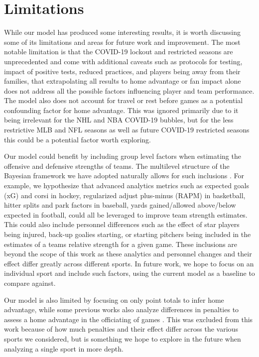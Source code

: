 \section*{Limitations}

While our model has produced some interesting results, it is worth discussing some of its limitations and areas for future work and improvement. The most notable limitation is that the COVID-19 lockout and restricted seasons are unprecedented and come with additional caveats such as protocols for testing, impact of positive tests, reduced practices, and players being away from their families, that extrapolating all results to home advantage or fan impact alone does not address all the possible factors influencing player and team performance. The model also does not account for travel or rest before games as a potential confounding factor for home advantage. This was ignored primarily due to it being irrelevant for the NHL and NBA COVID-19 bubbles, but for the less restrictive MLB and NFL seasons as well as future COVID-19 restricted seasons this could be a potential factor worth exploring.

Our model could benefit by including group level factors when estimating the offensive and defensive strengths of teams. The multilevel structure of the Bayesian framework we have adopted naturally allows for such inclusions \cite{Gelman2006} \cite{Gelman2014} \cite{McElreath2020}. For example, we hypothesize that advanced analytics metrics such as expected goals (xG) and corsi in hockey, regularized adjust plus-minus (RAPM) in basketball, hitter splits and park factors in baseball, yards gained/allowed above/below expected in football, could all be leveraged to improve team strength estimates. This could also include personnel differences such as the effect of star players being injured, back-up goalies starting, or starting pitchers being included in the estimates of a teams relative strength for a given game. These inclusions are beyond the scope of this work as these analytics and personnel changes and their effect differ greatly across different sports. In future work, we hope to focus on an individual sport and include such factors, using the current model as a baseline to compare against.

Our model is also limited by focusing on only point totals to infer home advantage, while some previous works also analyze differences in penalties to assess a home advantage in the officiating of games \cite{Benz2020} \cite{Unkelbach2010} \cite{Buraimo2010} \cite{Dohmen2016}. This was excluded from this work because of how much penalties and their effect differ across the various sports we considered, but is something we hope to explore in the future when analyzing a single sport in more depth.

